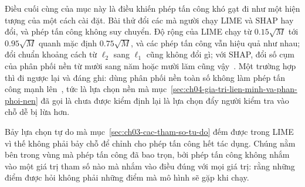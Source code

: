 %
Điều cuối cùng của mục này là điều khiến phép tấn công khó gạt đi như một hiện
tượng của một cách cài đặt. Bài thử đổi các 
mà người chạy LIME và SHAP hay đổi, và phép tấn công không suy chuyển. Độ rộng
 của LIME chạy từ $0.15\sqrt{M}$ tới $0.95\sqrt{M}$ quanh
mặc định $0.75\sqrt{M}$, và các phép tấn công vẫn hiệu quả như nhau; đổi chuẩn
khoảng cách từ $\ell_2$ sang $\ell_1$ cũng không đổi gì; với SHAP, đổi số cụm
của phân phối nền từ mười sang năm hoặc mười lăm cũng vậy~\autocite{mfooling}.
Một trường hợp thì đi ngược lại và đáng ghi: dùng phân phối nền toàn số không
làm phép tấn công mạnh lên~\autocite{mfooling}, tức là lựa chọn nền mà
mục~\ref{sec:ch04-gia-tri-lien-minh-va-phan-phoi-nen} đã gọi là chưa được kiểm
định lại là lựa chọn đẩy người kiểm tra vào chỗ dễ bị lừa hơn.

Bảy lựa chọn tự do mà mục~\ref{sec:ch03-cac-tham-so-tu-do} đếm được trong LIME
vì thế không phải bảy chỗ để chỉnh cho phép tấn công hết tác dụng. Chúng nằm
bên trong vùng mà phép tấn công đã bao trọn, bởi phép tấn công không nhắm vào
một giá trị tham số nào mà nhắm vào điều đúng với mọi giá trị: rằng những điểm
được hỏi không phải những điểm mà mô hình sẽ gặp khi chạy.

%
